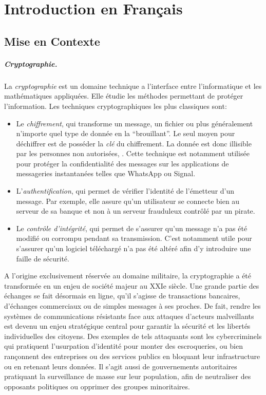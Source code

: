 
\chapter*{Introduction en Français}


\section*{Mise en Contexte}

\paragraph{Cryptographie.} La \textit{cryptographie} est un domaine technique a l'interface entre l'informatique et les mathématiques appliquées. Elle étudie les méthodes permettant de protéger l'information. Les techniques cryptographiques les plus classiques sont:
\begin{itemize}
	\item Le \textit{chiffrement}, qui transforme un message, un fichier ou plus généralement n'importe quel type de donnée en la ``brouillant''. Le seul moyen pour déchiffrer est de posséder la \textit{clé} du chiffrement. La donnée est donc illisible par les personnes non autorisées, . Cette technique est notamment utilisée pour protéger la confidentialité des messages sur les applications de messageries instantanées telles que WhatsApp ou Signal.
	\item L'\textit{authentification}, qui permet de vérifier l'identité de l'émetteur d'un message. Par exemple, elle assure qu’un utilisateur se connecte bien au serveur de sa banque et non à un serveur frauduleux contrôlé par un pirate.
	\item Le \textit{contrôle d'intégrité}, qui permet de s'assurer qu'un message n'a pas été modifié ou corrompu pendant sa transmission. C'est notamment utile pour s'assurer qu'un logiciel téléchargé n'a pas été altéré afin d'y introduire une faille de sécurité.
\end{itemize}


A l'origine exclusivement réservée au domaine militaire, la cryptographie a été transformée en un enjeu de société majeur au XXIe siècle. Une grande partie des échanges se fait désormais en ligne, qu'il s'agisse de transactions bancaires, d'échanges commerciaux ou de simples messages à ses proches. De fait, rendre les systèmes de communications résistants face aux attaques d'acteurs malveillants est devenu  un enjeu stratégique central pour garantir la sécurité et les libertés individuelles des citoyens. Des exemples de tels attaquants sont les cybercriminels qui pratiquent l'usurpation d'identité pour monter des escroqueries, ou bien rançonnent des entreprises ou des services publics en bloquant leur infrastructure ou en retenant leurs données. Il s'agit aussi de gouvernements autoritaires pratiquant la surveillance de masse sur leur population, afin de neutraliser des opposants politiques ou opprimer des groupes minoritaires.

